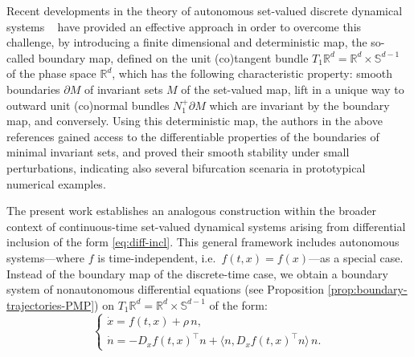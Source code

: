 \documentclass[reqno]{amsart}
\theoremstyle{definition}
\numberwithin{equation}{section}
\begin{document}
Recent developments in the theory of autonomous set-valued discrete dynamical systems ~\cite{kourliouros2023persistence,lamb2023attractors,lamb2025bifurcations,Tey2022minimal} have provided an effective approach in order to overcome this challenge, by introducing a finite dimensional and deterministic map, the so-called boundary map, defined on the unit (co)tangent bundle $T_1\mathbb{R}^d=\mathbb{R}^d\times \mathbb{S}^{d-1}$  of the phase space $\mathbb{R}^d$, which has the following characteristic property: smooth boundaries $\partial M$ of invariant sets $M$ of the set-valued map, lift in a unique way to outward unit (co)normal bundles $N_1^+\partial M$ which are invariant by the boundary map, and conversely. Using this deterministic map, the authors in the above references gained access to the differentiable properties of the boundaries of minimal invariant sets, and proved their smooth stability under small perturbations, indicating also several bifurcation scenaria in prototypical numerical examples.  

The present work establishes an analogous construction within the broader context of continuous-time set-valued dynamical systems arising from differential inclusion of the form \eqref{eq:diff-incl}. This general framework includes autonomous systems---where $f$ is time-independent, i.e.~$f(t,x)=f(x)$---as a special case. Instead of the boundary map of the discrete-time case, we obtain a boundary system of nonautonomous differential equations (see Proposition \ref{prop:boundary-trajectories-PMP}) on $T_1\mathbb{R}^d=\mathbb{R}^d\times \mathbb{S}^{d-1}$ of the form:   
\begin{equation}\label{eq:boundary-system-0}
     \begin{cases}
    \dot x=f(t,x)+\rho\,n,\\
    \dot n=-D_xf(t,x)^\top n+\langle n,D_xf(t,x)^\top n\rangle\, n.
\end{cases}
     \end{equation}  
\end{document}
